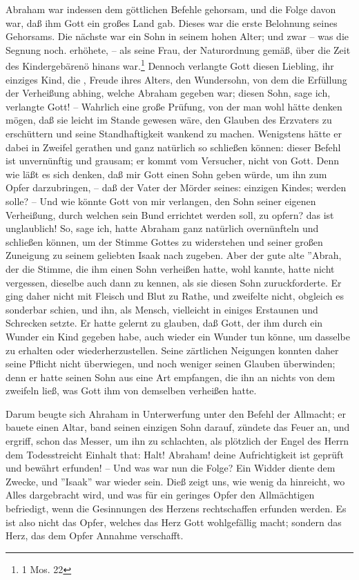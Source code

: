Abraham war indessen dem göttlichen Befehle gehorsam, und die Folge davon war,
daß ihm Gott ein großes Land gab. Dieses war die erste Belohnung seines
Gehorsams. Die nächste war ein Sohn in seinem hohen Alter; und zwar -- was die
Segnung noch. erhöhete, -- als seine Frau, der Naturordnung gemäß, über die Zeit
des Kindergebärenö hinans war.\footnote{1 Mos. 22} Dennoch verlangte Gott diesen
Liebling, ihr einziges Kind, die , Freude ihres Alters, den Wundersohn, von dem
die Erfüllung der Verheißung abhing, welche Abraham gegeben war; diesen Sohn,
sage ich, verlangte Gott! -- Wahrlich eine große Prüfung, von der man wohl hätte
denken mögen, daß sie leicht im Stande gewesen wäre, den Glauben des Erzvaters
zu erschüttern und seine Standhaftigkeit wankend zu machen. Wenigstens hätte er
dabei in Zweifel gerathen und ganz natürlich so schließen können: dieser Befehl
ist unvernünftig und grausam; er kommt vom Versucher, nicht von Gott. Denn wie
läßt es sich denken, daß mir Gott einen Sohn geben würde, um ihn zum Opfer
darzubringen, -- daß der Vater der Mörder seines: einzigen Kindes; werden solle?
-- Und wie könnte Gott von mir verlangen, den Sohn seiner eigenen Verheißung,
durch welchen sein Bund errichtet werden soll, zu opfern? das ist unglaublich!
So, sage ich, hatte Abraham ganz natürlich overnünfteln und schließen können, um
der Stimme Gottes zu widerstehen und seiner großen Zuneigung zu seinem geliebten
Isaak nach zugeben. Aber der gute alte ''Abrah, der die Stimme, die ihm einen
Sohn verheißen hatte, wohl kannte, hatte nicht vergessen, dieselbe auch dann zu
kennen, als sie diesen Sohn zuruckforderte. Er ging daher nicht mit Fleisch und
Blut zu Rathe, und zweifelte nicht, obgleich es sonderbar schien, und ihn, als
Mensch, vielleicht in einiges Erstaunen und Schrecken setzte. Er hatte gelernt
zu glauben, daß Gott, der ihm durch ein Wunder ein Kind gegeben habe, auch
wieder ein Wunder tun könne, um dasselbe zu erhalten oder wiederherzustellen.
Seine zärtlichen Neigungen konnten daher seine Pflicht nicht überwiegen, und
noch weniger seinen Glauben überwinden; denn er hatte seinen Sohn aus eine Art
empfangen, die ihn an nichts von dem zweifeln ließ, was Gott ihm von demselben
verheißen hatte.

\medskip

Darum beugte sich Ahraham in Unterwerfung unter den Befehl der Allmacht; er
bauete einen Altar, band seinen einzigen Sohn darauf, zündete das Feuer an, und
ergriff, schon das Messer, um ihn zu schlachten, als plötzlich der Engel des
Herrn dem Todesstreicht Einhalt that: Halt! Abraham! deine Aufrichtigkeit ist
geprüft und bewährt erfunden! -- Und was war nun die Folge? Ein Widder diente
dem Zwecke, und ''Isaak'' war wieder sein. Dieß zeigt uns, wie wenig da
hinreicht, wo Alles dargebracht wird, und was für ein geringes Opfer den
Allmächtigen befriedigt, wenn die Gesinnungen des Herzens rechtschaffen erfunden
werden. Es ist also nicht das Opfer, welches das Herz Gott wohlgefällig macht;
sondern das Herz, das dem Opfer Annahme verschafft.

